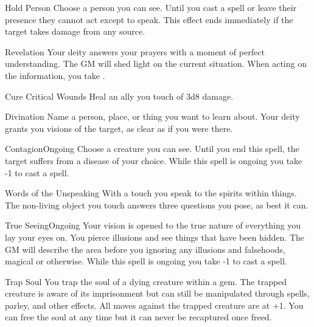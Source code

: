 \documentclass[8pt]{extarticle}
\begin{document}
\begin{multicols}{2}
  \begin{aspell}{Hold Person}{}
    Choose a person you can see. Until you cast a spell or leave their
    presence they cannot act except to speak. This effect ends
    immediately if the target takes damage from any source.
  \end{aspell}
  \vfill\null
\end{multicols}
\clearpage

\begin{multicols}{2}
\begin{aspell}{Revelation}{}
  Your deity answers your prayers with a moment of perfect
  understanding. The GM will shed light on the current situation. When
  acting on the information, you take .
\end{aspell}

\begin{aspell}{Cure Critical Wounds}{}
  Heal an ally you touch of 3d8 damage.
\end{aspell}

\begin{aspell}{Divination}{}
  Name a person, place, or thing you want to learn about. Your deity
  grants you visions of the target, as clear as if you were there.
\end{aspell}

\begin{aspell}{Contagion}{Ongoing}
  Choose a creature you can see. Until you end this spell, the target
  suffers from a disease of your choice. While this spell is ongoing
  you take -1 to cast a spell.
\end{aspell}
\vfill\null
\columnbreak

\begin{aspell}{Words of the Unspeaking}{}
  With a touch you speak to the spirits within things. The non-living
  object you touch answers three questions you pose, as best it can.
\end{aspell}

\begin{aspell}{True Seeing}{Ongoing}
  Your vision is opened to the true nature of everything you lay your
  eyes on. You pierce illusions and see things that have been
  hidden. The GM will describe the area before you ignoring any
  illusions and falsehoods, magical or otherwise.  While this spell is
  ongoing you take -1 to cast a spell.
\end{aspell}

\begin{aspell}{Trap Soul}{}
  You trap the soul of a dying creature within a gem. The trapped
  creature is aware of its imprisonment but can still be manipulated
  through spells, parley, and other effects. All moves against the
  trapped creature are at +1. You can free the soul at any time but it
  can never be recaptured once freed.
\end{aspell}

\vfill\null
\end{multicols}
\end{document}
